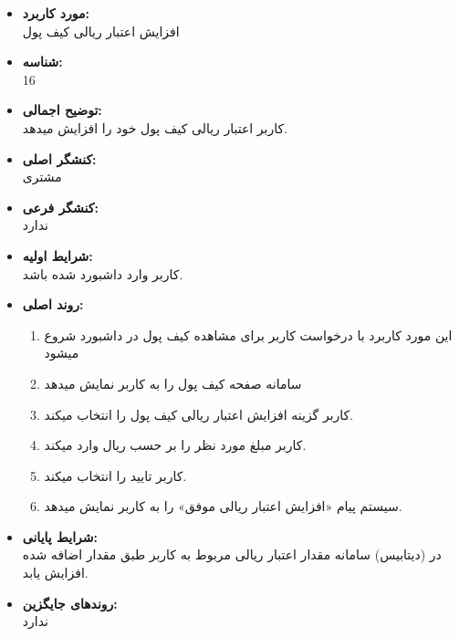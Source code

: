 \documentclass{article}
\begin{document}
\begin{itemize}
\item \textbf{مورد کاربرد:}\\
افزایش اعتبار ریالی کیف پول
\item \textbf{شناسه:}\\
16
\item \textbf{توضیح اجمالی:}\\
کاربر اعتبار ریالی کیف پول خود را افزایش میدهد.
\item \textbf{کنشگر اصلی:}\\
مشتری
\item \textbf{کنشگر فرعی:}\\
ندارد
\item \textbf{شرایط اولیه:}\\
کاربر وارد داشبورد شده باشد.
\item \textbf{روند اصلی:}\\
\begin{enumerate}
\item  این مورد کاربرد با درخواست کاربر برای مشاهده کیف پول در داشبورد شروع میشود
\item سامانه صفحه  کیف پول را به کاربر نمایش میدهد
\item کاربر گزینه افزایش اعتبار ریالی کیف پول را انتخاب میکند.
\item کاربر مبلغ مورد نظر را بر حسب ریال وارد میکند.
\item کاربر تایید را انتخاب میکند.
\item سیستم پیام «افزایش اعتبار ریالی موفق» را به کاربر نمایش میدهد.
\end{enumerate}
\item \textbf{شرایط پایانی:}\\ 
در (دیتابیس) سامانه مقدار اعتبار ریالی مربوط به کاربر طبق مقدار اضافه شده افزایش یابد.
\item \textbf{روندهای جایگزین:}\\
ندارد
\end{itemize}
\noindent\makebox[\linewidth]{\rule{\paperwidth}{0.4pt}}
\end{document}

